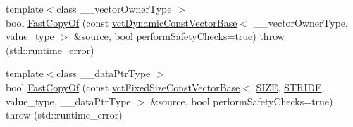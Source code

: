 \begin{DoxyCompactItemize}
\item 
{\footnotesize template$<$class \-\_\-\-\_\-vector\-Owner\-Type $>$ }\\bool \hyperlink{classvct_fixed_size_vector_base_a070fb6cbdc5c395de2f8e7e0444d5ba9}{Fast\-Copy\-Of} (const \hyperlink{classvct_dynamic_const_vector_base}{vct\-Dynamic\-Const\-Vector\-Base}$<$ \-\_\-\-\_\-vector\-Owner\-Type, value\-\_\-type $>$ \&source, bool perform\-Safety\-Checks=true)  throw (std\-::runtime\-\_\-error)
\item 
{\footnotesize template$<$class \-\_\-\-\_\-data\-Ptr\-Type $>$ }\\bool \hyperlink{classvct_fixed_size_vector_base_aa1c832d7b4483eee2d5aee6ba75f0398}{Fast\-Copy\-Of} (const \hyperlink{classvct_fixed_size_const_vector_base}{vct\-Fixed\-Size\-Const\-Vector\-Base}$<$ \hyperlink{classvct_fixed_size_vector_base_a688214b662551929a8d92e4ed7be0d42ae6389ee04e4be20faf1c7639de3202fb}{S\-I\-Z\-E}, \hyperlink{classvct_fixed_size_vector_base_ace3f97f061ae60acb29f9719787d18a3a953b66e9631c2c4ff134062e7e09a37d}{S\-T\-R\-I\-D\-E}, value\-\_\-type, \-\_\-\-\_\-data\-Ptr\-Type $>$ \&source, bool perform\-Safety\-Checks=true)  throw (std\-::runtime\-\_\-error)
\end{DoxyCompactItemize}

